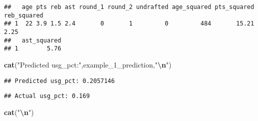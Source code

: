 \documentclass[
]{article}
\newenvironment{Shaded}{\begin{snugshade}}{\end{snugshade}}
\newcommand{\FunctionTok}[1]{\textcolor[rgb]{0.13,0.29,0.53}{\textbf{#1}}}
\newcommand{\NormalTok}[1]{#1}
\newcommand{\SpecialCharTok}[1]{\textcolor[rgb]{0.81,0.36,0.00}{\textbf{#1}}}
\newcommand{\StringTok}[1]{\textcolor[rgb]{0.31,0.60,0.02}{#1}}
\begin{document}
\begin{verbatim}
##   age pts reb ast round_1 round_2 undrafted age_squared pts_squared reb_squared
## 1  22 3.9 1.5 2.4       0       1         0         484       15.21        2.25
##   ast_squared
## 1        5.76
\end{verbatim}

\begin{Shaded}
\begin{Highlighting}[]
\FunctionTok{cat}\NormalTok{(}\StringTok{"Predicted usg\_pct:"}\NormalTok{,example\_1\_prediction,}\StringTok{"}\SpecialCharTok{\textbackslash{}n}\StringTok{"}\NormalTok{)}
\end{Highlighting}
\end{Shaded}

\begin{verbatim}
## Predicted usg_pct: 0.2057146
\end{verbatim}

\begin{Shaded}
\end{Shaded}

\begin{verbatim}
## Actual usg_pct: 0.169
\end{verbatim}

\begin{Shaded}
\begin{Highlighting}[]
\FunctionTok{cat}\NormalTok{(}\StringTok{"}\SpecialCharTok{\textbackslash{}n}\StringTok{"}\NormalTok{)}
\end{Highlighting}
\end{Shaded}
\end{document}
